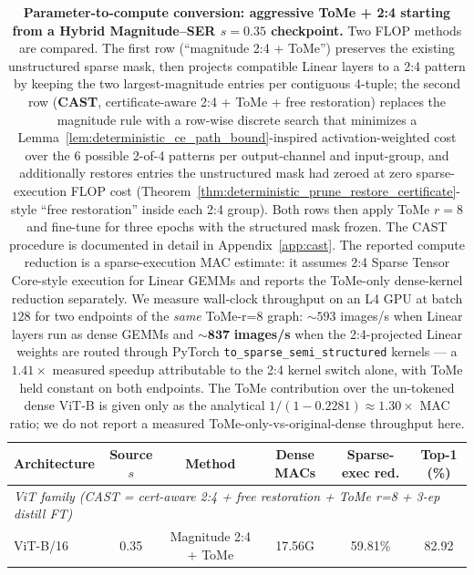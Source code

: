\documentclass[11pt]{article}
\theoremstyle{plain}
\theoremstyle{definition}
\theoremstyle{remark}
\newcommand{\1}{\mathbf{1}}
\begin{document}
\begin{table}[ht]
\centering
\caption{\textbf{Parameter-to-compute conversion: aggressive ToMe + 2:4 starting from a Hybrid Magnitude--SER \(s=0.35\) checkpoint.}  Two FLOP methods are compared.  The first row (``magnitude 2:4 + ToMe'') preserves the existing unstructured sparse mask, then projects compatible Linear layers to a 2:4 pattern by keeping the two largest-magnitude entries per contiguous 4-tuple; the second row (\textbf{CAST}, certificate-aware 2:4 + ToMe + free restoration) replaces the magnitude rule with a row-wise discrete search that minimizes a Lemma~\ref{lem:deterministic_ce_path_bound}-inspired activation-weighted cost over the 6 possible 2-of-4 patterns per output-channel and input-group, and additionally restores entries the unstructured mask had zeroed at zero sparse-execution FLOP cost (Theorem~\ref{thm:deterministic_prune_restore_certificate}-style ``free restoration'' inside each 2:4 group).  Both rows then apply ToMe \(r=8\) \cite{bolya2023tome} and fine-tune for three epochs with the structured mask frozen.  The CAST procedure is documented in detail in Appendix~\ref{app:cast}.  The reported compute reduction is a sparse-execution MAC estimate: it assumes 2:4 Sparse Tensor Core-style execution for Linear GEMMs \cite{mishra2021accelerating} and reports the ToMe-only dense-kernel reduction separately.  We measure wall-clock throughput on an L4 GPU at batch \(128\) for two endpoints of the \emph{same} ToMe-r=8 graph: \(\sim\!593\) images/s when Linear layers run as dense GEMMs and \(\sim\!\mathbf{837}\) \textbf{images/s} when the 2:4-projected Linear weights are routed through PyTorch \texttt{to\_sparse\_semi\_structured} kernels --- a \(1.41\!\times\) measured speedup attributable to the 2:4 kernel switch alone, with ToMe held constant on both endpoints.  The ToMe contribution over the un-tokened dense ViT-B is given only as the analytical \(1/(1\!-\!0.2281)\!\approx\!1.30\!\times\) MAC ratio; we do not report a measured ToMe-only-vs-original-dense throughput here.}
\label{tab:param_to_flop_followup}
\scriptsize
\setlength{\tabcolsep}{2.5pt}
\begin{tabular}{lccccc}
\toprule
Architecture & Source \(s\) & Method & Dense MACs & Sparse-exec red. & Top-1 (\%) \\
\midrule
\multicolumn{6}{l}{\textit{ViT family (CAST = cert-aware 2:4 + free restoration + ToMe r=8 + 3-ep distill FT)}} \\
ViT-B/16   & 0.35 & Magnitude 2:4 + ToMe & 17.56G & 59.81\% & 82.92 \\

\end{tabular}
\end{table}
\end{document}
